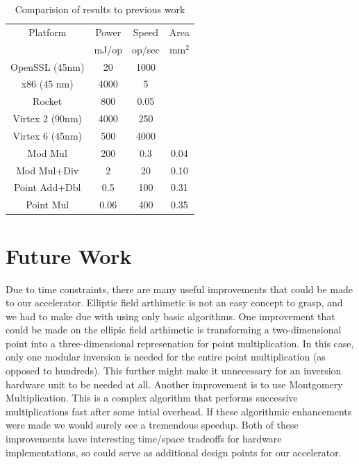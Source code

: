 \documentclass[twocolumn]{article}
\begin{document}
\begin{table}[ht]
  \begin{center}
    \begin{tabular}{c|ccc}
      Platform        & Power & Speed  & Area \\
                      & mJ/op & op/sec & mm$^2$ \\
      \hline
      OpenSSL (45nm)  & 20    & 1000   &      \\
      x86 (45 nm)     & 4000  & 5      &      \\
      Rocket          & 800   & 0.05   &      \\
      Virtex 2 (90nm) & 4000  & 250    &      \\
      Virtex 6 (45nm) & 500   & 4000   &      \\
      \hline
      Mod Mul         & 200   & 0.3    & 0.04 \\
      Mod Mul+Div     & 2     & 20     & 0.10 \\
      Point Add+Dbl   & 0.5   & 100    & 0.31 \\
      Point Mul       & 0.06  & 400    & 0.35 \\
    \end{tabular}
  \end{center}

  \caption{Comparision of results to previous work
    \label{results}}
\end{table}

\section{Future Work}

Due to time constraints, there are many useful improvements that could
be made to our accelerator. Elliptic field arthimetic is not an easy
concept to grasp, and we had to make due with using only basic
algorithms. One improvement that could be made on the ellipic field
arthimetic is transforming a two-dimensional point into a
three-dimensional represenation for point multiplication. In this
case, only one modular inversion is needed for the entire point
multiplication (as opposed to hundreds). This further might make it
unnecessary for an inversion hardware unit to be needed at
all. Another improvement is to use Montgomery
Multiplication\cite{mmm-hw_ecc}. This is a complex algorithm that
performs successive multiplications fast after some intial
overhead. If these algorithmic enhancements were made we would surely
see a tremendous speedup. Both of these improvements have interesting
time/space tradeoffs for hardware implementations, so could serve as
additional design points for our accelerator.
\end{document}
